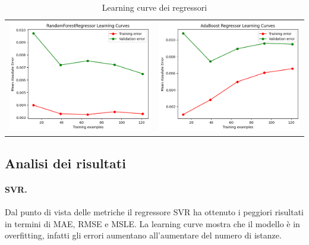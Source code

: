 \begin{table}[H]
\begin{tabular}{c c}
        \includegraphics[scale=0.3]{images/RandomForestRegressor_lc.png} & \includegraphics[scale=0.3]{images/AdaBoostRegressor_lc.png} \\
    \end{tabular}
    \caption*{Learning curve dei regressori}
    \label{tab:lc}
\end{table}

\subsection{Analisi dei risultati}


    \paragraph{\textbf{SVR}.}
    Dal punto di vista delle metriche il regressore SVR ha ottenuto i peggiori risultati in termini di MAE, RMSE e MSLE. La learning curve mostra che il modello è in overfitting, infatti gli errori aumentano all'aumentare del numero di istanze.
   
